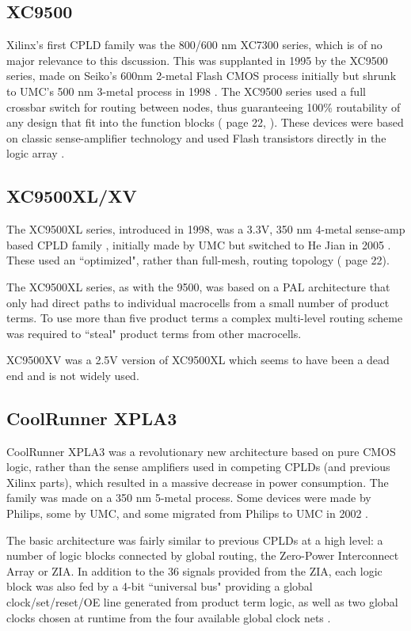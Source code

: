 \documentclass[pdftex,letterpaper]{article}
\begin{document}
\subsection{XC9500}

Xilinx's first CPLD family was the 800/600 nm XC7300 series, which is of no major relevance to this dscussion. 
This was supplanted in 1995 by the XC9500 series, made on Seiko's 600nm 2-metal Flash CMOS process initially 
\cite{fastflash} but shrunk to UMC's 500 nm 3-metal process in 1998 \cite{pcn98003}. The XC9500 series used a 
full crossbar switch for routing between nodes, thus guaranteeing 100\% routability of any design that fit into 
the function blocks (\cite{ischandbook} page 22, \cite{fastflash}). These devices were based on classic 
sense-amplifier technology and used Flash transistors directly in the logic array \cite{xbrf010}.

\subsection{XC9500XL/XV}

The XC9500XL series, introduced in 1998, was a 3.3V, 350 nm 4-metal sense-amp based CPLD family \cite{ds054}, 
initially made by UMC but switched to He Jian in 2005 \cite{xcn05003}. These used an ``optimized", rather than 
full-mesh, routing topology (\cite{ischandbook} page 22).

The XC9500XL series, as with the 9500, was based on a PAL architecture that only had direct paths to individual 
macrocells from a small number of product terms. To use more than five product terms a complex multi-level routing 
scheme was required to ``steal" product terms from other macrocells.

XC9500XV was a 2.5V version of XC9500XL which seems to have been a dead end and is not widely used.

\subsection{CoolRunner XPLA3}

CoolRunner XPLA3 was a revolutionary new architecture based on pure CMOS logic, rather than the sense amplifiers 
used in competing CPLDs (and previous Xilinx parts), which resulted in a massive decrease in power consumption. The 
family was made on a 350 nm 5-metal process. Some devices were made by Philips, some by UMC, and some migrated from
Philips to UMC in 2002 \cite{pcn200211}.

The basic architecture was fairly similar to previous CPLDs at a high level: a number of logic blocks connected by 
global routing, the Zero-Power Interconnect Array or ZIA. In addition to the 36 signals provided from the ZIA, each 
logic block was also fed by a 4-bit ``universal bus" providing a global clock/set/reset/OE line generated from product 
term logic, as well as two global clocks chosen at runtime from the four available global clock nets \cite{wp105}.
\end{document}
